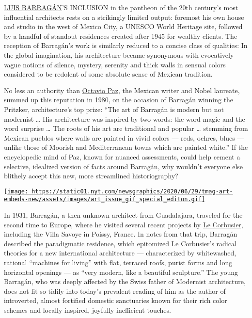 \href{https://www.nytimes.com/2014/06/15/travel/finding-mexico-city-and-luis-barragan-again.html}{LUIS
BARRAGÁN}'S INCLUSION in the pantheon of the 20th century's most
influential architects rests on a strikingly limited output: foremost
his own house and studio in the west of Mexico City, a UNESCO World
Heritage site, followed by a handful of standout residences created
after 1945 for wealthy clients. The reception of Barragán's work is
similarly reduced to a concise class of qualities: In the global
imagination, his architecture became synonymous with evocatively vague
notions of silence, mystery, serenity and thick walls in sensual colors
considered to be redolent of some absolute sense of Mexican tradition.

No less an authority than
\href{https://www.nytimes.com/1998/04/21/books/octavio-paz-mexico-s-man-of-letters-dies-at-84.html}{Octavio
Paz}, the Mexican writer and Nobel laureate, summed up this reputation
in 1980, on the occasion of Barragán winning the Pritzker,
architecture's top prize: ``The art of Barragán is modern but not
modernist \ldots{} His architecture was inspired by two words: the word
magic and the word surprise \ldots{} The roots of his art are
traditional and popular \ldots{} stemming from Mexican pueblos where
walls are painted in vivid colors --- reds, ochres, blues --- unlike
those of Moorish and Mediterranean towns which are painted white.'' If
the encyclopedic mind of Paz, known for nuanced assessments, could help
cement a selective, idealized version of facts around Barragán, why
wouldn't everyone else blithely accept this new, more streamlined
historiography?

\href{https://www.nytimes.com/issue/t-magazine/2020/07/02/true-believers-art-issue}{\texttt{[image: https://static01.nyt.com/newsgraphics/2020/06/29/tmag-art-embeds-new/assets/images/art\_issue\_gif\_special\_editon.gif]}}

In 1931, Barragán, a then unknown architect from Guadalajara, traveled
for the second time to Europe, where he visited several recent projects
by \href{https://www.nytimes.com/topic/person/le-corbusier}{Le
Corbusier}, including the Villa Savoye in Poissy, France. In notes from
that trip, Barragán described the paradigmatic residence, which
epitomized Le Corbusier's radical theories for a new international
architecture --- characterized by whitewashed, rational ``machines for
living'' with flat, terraced roofs, purist forms and long horizontal
openings --- as ``very modern, like a beautiful sculpture.'' The young
Barragán, who was deeply affected by the Swiss father of Modernist
architecture, does not fit so tidily into today's prevalent reading of
him as the author of introverted, almost fortified domestic sanctuaries
known for their rich color schemes and locally inspired, joyfully
inefficient touches.

